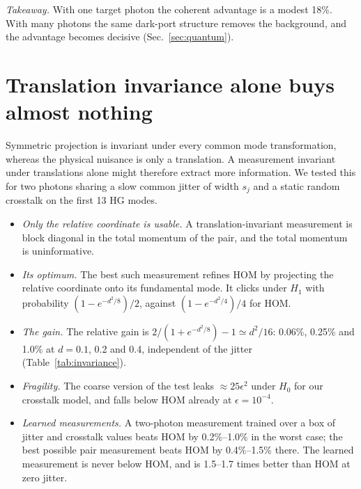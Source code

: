 \documentclass[reprint,pra,aps,amsmath,amssymb,superscriptaddress,nofootinbib]{revtex4-2}
\begin{document}
\emph{Takeaway.} With one target photon the coherent advantage is a modest 18\%. With many photons the same dark-port
structure removes the background, and the advantage becomes decisive (Sec.~\ref{sec:quantum}).

\section{Translation invariance alone buys almost nothing}
\label{sec:invariance}

Symmetric projection is invariant under every common mode transformation, whereas the physical nuisance is only a
translation. A measurement invariant under translations alone might therefore extract more information. We tested
this for two photons sharing a slow common jitter of width $s_j$ and a static random crosstalk on the first 13 HG
modes.
\begin{itemize}
\item \emph{Only the relative coordinate is usable.} A translation-invariant measurement is block diagonal in the
  total momentum of the pair, and the total momentum is uninformative.
\item \emph{Its optimum.} The best such measurement refines HOM by projecting the relative coordinate onto its
  fundamental mode. It clicks under $H_1$ with probability $(1-e^{-d^2/8})/2$, against $(1-e^{-d^2/4})/4$ for HOM.
\item \emph{The gain.} The relative gain is $2/(1+e^{-d^2/8})-1\simeq d^2/16$: 0.06\%, 0.25\% and 1.0\% at $d=0.1$,
  0.2 and 0.4, independent of the jitter (Table~\ref{tab:invariance}).
\item \emph{Fragility.} The coarse version of the test leaks $\approx25\epsilon^2$ under $H_0$ for our crosstalk
  model, and falls below HOM already at $\epsilon=10^{-4}$.
\item \emph{Learned measurements.} A two-photon measurement trained over a box of jitter and crosstalk values beats
  HOM by 0.2\%--1.0\% in the worst case; the best possible pair measurement beats HOM by 0.4\%--1.5\% there. The
  learned measurement is never below HOM, and is 1.5--1.7 times better than HOM at zero jitter.
\end{itemize}

\begin{table}[t]
\caption{Two-photon exponents relative to HOM. $E_{\rm T}$: optimal translation-invariant measurement (any
jitter). $E_{\rm pair}$: optimal pair measurement at jitter $s_j$. $\epsilon^\ast$: crosstalk at which the coarse
translation-invariant test falls below HOM ($s_j=0.4$). Generated from \texttt{results/qx2/qx2.json}.}
\label{tab:invariance}

\end{table}
\end{document}
